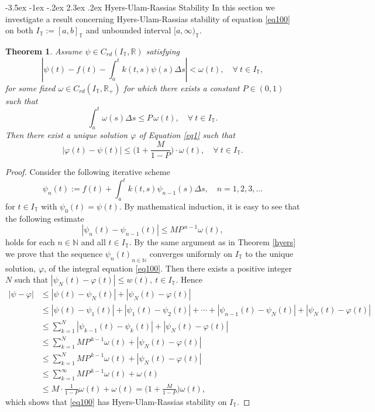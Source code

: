 \documentclass{article}
\makeatletter
\renewcommand\section{\@startsection {section}{1}{\z@}%
                                   {-3.5ex \@plus -1ex \@minus -.2ex}%
                                   {2.3ex \@plus.2ex}%
                                   {\normalfont\Large\bfseries
                                    \setcounter{equation}{0}
                                    \setcounter{thm}{0}}}
\newtheorem{thm}{Theorem}
\newcommand{\q}{\quad}
\makeatother
\begin{document}
\section{Hyers-Ulam-Rassias Stability}
In this section we investigate a result concerning Hyers-Ulam-Rassias stability of equation \eqref{eq100} on both $I_\mathbb{T}:=[a,b]_\mathbb{T}$ and unbounded interval $[a,\infty)_\mathbb{T}$.
\begin{thm}
 Assume $\psi\in C_{rd}(I_\mathbb{T},\mathbb{R})$ satisfying
$$
|\psi(t)-f(t)-\int_a^tk(t,s)\psi(s)\Delta s|<\omega(t), \q \forall \ t \in I_\mathbb{T},
$$
for some fixed $\omega\in C_{rd}(I_\mathbb{T},\mathbb{R}_+)$ for which there exists a constant $P\in(0,1)$ such that
 $$
 \int_a^t\omega(s)\Delta s\leq P\,\omega(t),\q \forall \ t \in I_\mathbb{T}.
 $$
 Then there exist a  unique solution $\varphi$ of Equation \eqref{eq1} such that
 $$
 |\varphi(t)-\psi(t)|\leq \Big(1+\frac{M}{1-P}\Big)\cdot\omega(t), \q \forall \ t \in I_\mathbb{T}.
 $$

\end{thm}

\begin{proof}
Consider the following iterative scheme
\begin{equation}\label{rec2}
\psi_{n}(t):=f(t)+\int_a^tk(t,s)\psi_{n-1}(s)\Delta s, \q n=1,2,3,\ldots
\end{equation}
 for $t\in I_\mathbb{T}$ with $\psi_0(t)=\psi(t)$. By mathematical induction, it is easy to see that the following estimate
 \begin{equation}\label{estim}
   |\psi_{n}(t)-\psi_{n-1}(t)|\leq MP^{\,n-1}\omega(t),
 \end{equation}
 holds for each $n\in \mathbb{N}$ and all $t\in I_\mathbb{T}$. By the same argument as in Theorem \ref{hyers} we prove that
 the sequence ${\psi_{n}(t)}_{n\in\mathbb{N}}$ converges uniformly on $I_\mathbb{T}$ to the unique solution, $\varphi$, of the integral equation \eqref{eq100}. Then there exists a positive integer $N$ such that $|\psi_N(t)-\varphi(t)|\leq w(t),\ t \in I_\mathbb{T}$. Hence
 \begin{align*}
|\psi-\varphi|&\leq |\psi(t)-\psi_N(t)|+|\psi_N(t)-\varphi(t)|\\
&\leq |\psi(t)-\psi_1(t)|+|\psi_1(t)-\psi_2(t)|+\cdots +|\psi_{n-1}(t)-\psi_N(t)|+|\psi_N(t)-\varphi(t)|\\
&\leq \sum_{k=1}^N|\psi_{k-1}(t)-\psi_k(t)|+|\psi_N(t)-\varphi(t)|\\
&\leq \sum_{k=1}^NMP^{\,k-1}\omega(t)+|\psi_N(t)-\varphi(t)|\\
&\leq \sum_{k=1}^NMP^{\,k-1}\omega(t)+|\psi_N(t)-\varphi(t)|\\
&\leq \sum_{k=1}^\infty MP^{\,k-1}\omega(t)+\omega(t)\\
&\leq M\cdot\frac{1}{1-P}\omega(t)+\omega(t)=\Big(1+\frac{M}{1-P}\Big)\omega(t),
\end{align*}
which shows that \eqref{eq100} has Hyers-Ulam-Rassias stability on $I_\mathbb{T}$.
\end{proof}
\end{document}
